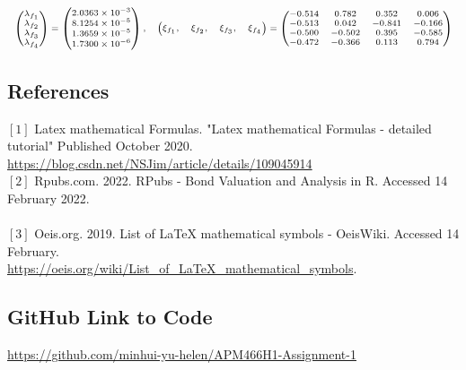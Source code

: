 \documentclass[10pt]{article}
\begin{document}
\begin{enumerate}
$$\begin{scriptsize}
            \begin{array}{ll}   
            \begin{pmatrix} 
            \lambda_{f_1} \\ 
            \lambda_{f_2} \\
            \lambda_{f_3} \\        
            \lambda_{f_4} 
            \end{pmatrix} = \begin{pmatrix}
            2.0363 \times 10^{-3}  \\
            8.1254 \times 10^{-5} \\
            1.3659 \times 10^{-5} \\
            1.7300 \times 10^{-6}
            \end{pmatrix}, \quad
            \begin{pmatrix} 
            \xi_{f_1}, & 
            \xi_{f_2}, &
            \xi_{f_3}, &       
            \xi_{f_4} 
            \end{pmatrix}= \begin{pmatrix}
            -0.514 & 0.782 & 0.352 & 0.006 \\
            -0.513 & 0.042 & -0.841 & -0.166 \\
            -0.500 & -0.502 & 0.395 & -0.585 \\
            -0.472 & -0.366 & 0.113 & 0.794
            \end{pmatrix}
            \end{array}
        \end{scriptsize}
        $$
        
\end{enumerate}

\subsection*{References}

$[1]$ Latex mathematical Formulas. "Latex mathematical Formulas - detailed tutorial" Published October 2020.\\
\href{https://blog.csdn.net/NSJim/article/details/109045914} {https://blog.csdn.net/NSJim/article/details/109045914} \\
$[2]$ Rpubs.com. 2022. RPubs - Bond Valuation and Analysis in R. Accessed 14 February 2022. \\  \\
$[3]$ Oeis.org. 2019. List of LaTeX mathematical symbols - OeisWiki. Accessed 14 February. \\ \href{https://oeis.org/wiki/List_of_LaTeX_mathematical_symbols_2022}{https://oeis.org/wiki/List_of_LaTeX_mathematical_symbols}.

\subsection*{GitHub Link to Code}

\href{https://github.com/minhui-yu-helen/APM466H1-Assignment-1}{https://github.com/minhui-yu-helen/APM466H1-Assignment-1}
\end{document}
